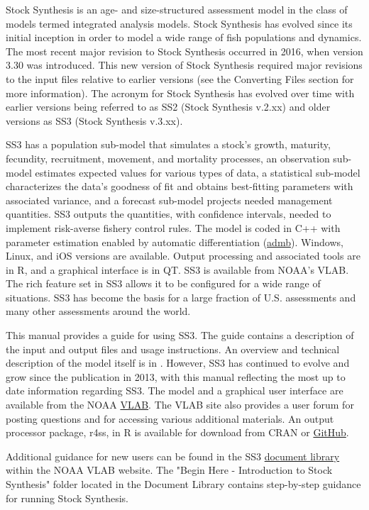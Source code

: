 Stock Synthesis is an age- and size-structured assessment model in the class of models termed integrated analysis models. Stock Synthesis has evolved since its initial inception in order to model a wide range of fish populations and dynamics.  The most recent major revision to Stock Synthesis occurred in 2016, when version 3.30 was introduced. This new version of Stock Synthesis required major revisions to the input files relative to earlier versions (see the \hypertarget{ConvIssues}{Converting Files} section for more information). The acronym for Stock Synthesis has evolved over time with earlier versions being referred to as SS2 (Stock Synthesis v.2.xx) and older versions as SS3 (Stock Synthesis v.3.xx). 

SS3 has a population sub-model that simulates a stock's growth, maturity, fecundity, recruitment, movement, and mortality processes, an observation sub-model estimates expected values for various types of data, a statistical sub-model characterizes the data’s goodness of fit and obtains best-fitting parameters with associated variance, and a forecast sub-model projects needed management quantities.  SS3 outputs the quantities, with confidence intervals, needed to implement risk-averse fishery control rules. The model is coded in C++ with parameter estimation enabled by automatic differentiation (\href{http://www.admb-project.org}{admb}).  Windows, Linux, and iOS versions are available.  Output processing and associated tools are in R, and a graphical interface is in QT.  SS3 is available from NOAA’s VLAB. The rich feature set in SS3 allows it to be configured for a wide range of situations.  SS3 has become the basis for a large fraction of U.S. assessments and many other assessments around the world.  

This manual provides a guide for using SS3. The guide contains a description of the input and output files and usage instructions. An overview and technical description of the model itself is in \citet{methotstock2013}. However, SS3 has continued to evolve and grow since the publication in 2013, with this manual reflecting the most up to date information regarding SS3.  The model and a graphical user interface are available from the NOAA \href{https://vlab.noaa.gov/web/stock-synthesis}{VLAB}. The VLAB site also provides a user forum for posting questions and for accessing various additional materials.  An output processor package, r4ss, in R is available for download from CRAN or \href{https://github.com/r4ss/r4ss}{GitHub}.

Additional guidance for new users can be found in the SS3 \href{https://vlab.noaa.gov/web/stock-synthesis/document-library}{document library} within the NOAA VLAB website.  The "Begin Here - Introduction to Stock Synthesis" folder located in the Document Library contains step-by-step guidance for running Stock Synthesis.

